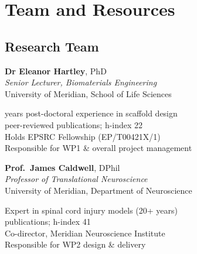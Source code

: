 \section{Team and Resources}

\subsection{Research Team}

\vspace{4pt}

\begin{minipage}[t]{0.48\textwidth}
\begin{tcolorbox}[sectionbox, title=Lead Applicant]
\textbf{Dr Eleanor Hartley}, PhD\\
\textit{Senior Lecturer, Biomaterials Engineering}\\
University of Meridian, School of Life Sciences

\vspace{4pt}
 years post-doctoral experience in scaffold design\\
 peer-reviewed publications; h-index 22\\
\pinkbullet Holds EPSRC Fellowship (EP/T00421X/1)\\
\pinkbullet Responsible for WP1 \& overall project management
\end{tcolorbox}
\end{minipage}%
\hfill
\begin{minipage}[t]{0.48\textwidth}
\begin{tcolorbox}[sectionbox, title=Co-Investigator]
\textbf{Prof.\ James Caldwell}, DPhil\\
\textit{Professor of Translational Neuroscience}\\
University of Meridian, Department of Neuroscience

\vspace{4pt}
\pinkbullet Expert in spinal cord injury models (20+ years)\\
 publications; h-index 41\\
\pinkbullet Co-director, Meridian Neuroscience Institute\\
\pinkbullet Responsible for WP2 design \& delivery
\end{tcolorbox}
\end{minipage}

\par
\vspace{6pt}

